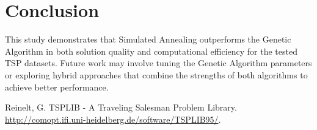 \documentclass{article}
\begin{document}
\section{Conclusion}
This study demonstrates that Simulated Annealing outperforms the Genetic Algorithm in both solution quality and computational efficiency for the tested TSP datasets. Future work may involve tuning the Genetic Algorithm parameters or exploring hybrid approaches that combine the strengths of both algorithms to achieve better performance.


\begin{thebibliography}{1}

 Reinelt, G. TSPLIB - A Traveling Salesman Problem Library. \url{http://comopt.ifi.uni-heidelberg.de/software/TSPLIB95/}.

\end{thebibliography}
\end{document}
